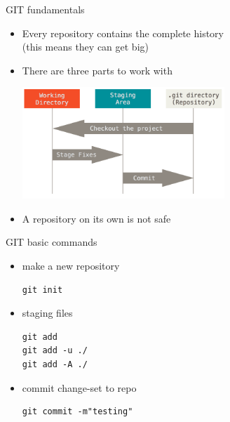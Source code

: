 \begin{frame}{GIT fundamentals}
  
  \begin{itemize}
  \item Every repository contains the complete history\\(this means
    they can get big)
  \item There are three parts to work with
    \begin{adjustbox}{center}
      \includegraphics[width=0.6\textwidth]{img/areas}
    \end{adjustbox}
  \item A repository on its own is not safe
  \end{itemize}


\end{frame}



\begin{frame}[fragile]{GIT basic commands}

  \begin{itemize}
  \item make a new repository
\begin{verbatim}
git init
\end{verbatim}
  \item staging files
\begin{verbatim}
git add
git add -u ./
git add -A ./
\end{verbatim}
  \item commit change-set to repo
\begin{verbatim}
git commit -m"testing"
\end{verbatim}
  \end{itemize}
\end{frame}


